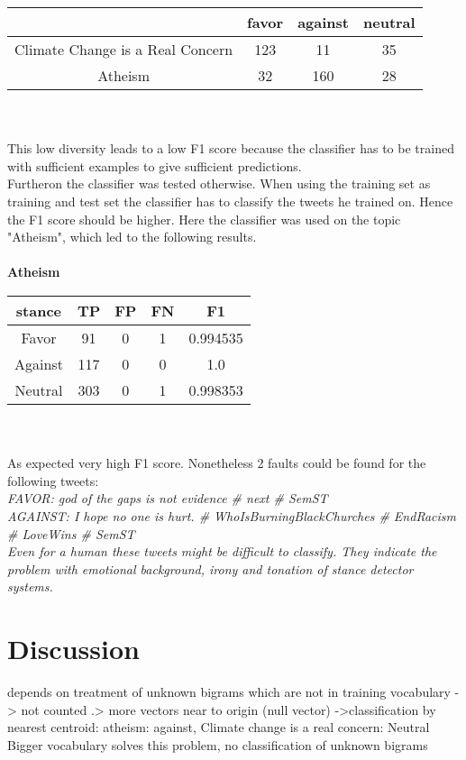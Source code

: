 \documentclass[a4paper,12pt,twoside]{article}
\begin{document}
\begin{tabular}{c|ccc}
& favor & against & neutral\\ \hline
Climate Change is a Real Concern & 123 & 11 & 35 \\
Atheism & 32 & 160 & 28 \\
\end{tabular} \\
\\
This low diversity leads to a low F1 score because the classifier has to be trained with sufficient examples to give sufficient predictions.\\
Furtheron the classifier was tested otherwise. When using the training set as training and test set the classifier has to classify the tweets he trained on. Hence the F1 score should be higher.
Here the classifier was used on the topic "Atheism", which led to the following results. \\
\\
\textbf{Atheism}
\\
\begin{tabular}{c|ccc|c}
stance & TP & FP & FN & F1\\ \hline
Favor & 91 & 0 & 1 & 0.994535\\
Against & 117 & 0 & 0 & 1.0\\
Neutral &  303 & 0 & 1 & 0.998353\\
\end{tabular}\\
\\
As expected very high F1 score. Nonetheless 2 faults could be found for the following tweets:\\
\em{FAVOR: god of the gaps is not evidence \# next \# SemST}\\
\em{AGAINST: I hope no one is hurt. \# WhoIsBurningBlackChurches \# EndRacism \# LoveWins \# SemST}\\
Even for a human these tweets might be difficult to classify. They indicate the problem with emotional background, irony and tonation of stance detector systems. 

\section{Discussion}

depends on treatment of unknown bigrams which are not in training vocabulary -> not counted .> more vectors near to origin (null vector) ->classification by nearest centroid: atheism: against, Climate change is a real concern: Neutral
Bigger vocabulary solves this problem, no classification of unknown bigrams
\end{document}
